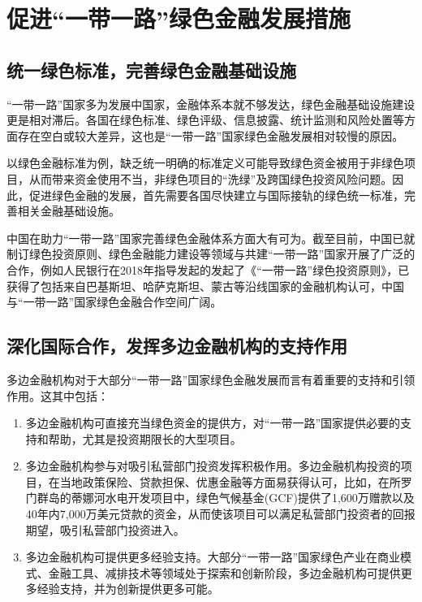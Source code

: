 \section*{促进“一带一路”绿色金融发展措施}
\subsection*{统一绿色标准，完善绿色金融基础设施}

“一带一路”国家多为发展中国家，金融体系本就不够发达，绿色金融基础设施建设更是相对滞后。各国在绿色标准、绿色评级、信息披露、统计监测和风险处置等方面存在空白或较大差异，这也是“一带一路”国家绿色金融发展相对较慢的原因。

以绿色金融标准为例，缺乏统一明确的标准定义可能导致绿色资金被用于非绿色项目，从而带来资金使用不当，非绿色项目的“洗绿”及跨国绿色投资风险问题。因此，促进绿色金融的发展，首先需要各国尽快建立与国际接轨的绿色统一标准，完善相关金融基础设施。

中国在助力“一带一路”国家完善绿色金融体系方面大有可为。截至目前，中国已就制订绿色投资原则、绿色金融能力建设等领域与共建“一带一路”国家开展了广泛的合作，例如人民银行在2018年指导发起的发起了《“一带一路”绿色投资原则》，已获得了包括来自巴基斯坦、哈萨克斯坦、蒙古等沿线国家的金融机构认可，中国与“一带一路”国家绿色金融合作空间广阔。

\subsection*{深化国际合作，发挥多边金融机构的支持作用}

多边金融机构对于大部分“一带一路”国家绿色金融发展而言有着重要的支持和引领作用。这其中包括：

\begin{enumerate}
    \item 多边金融机构可直接充当绿色资金的提供方，对“一带一路”国家提供必要的支持和帮助，尤其是投资期限长的大型项目。
    \item 多边金融机构参与对吸引私营部门投资发挥积极作用。多边金融机构投资的项目，在当地政策保险、贷款担保、优惠金融等方面易获得认可，比如，在所罗门群岛的蒂娜河水电开发项目中，绿色气候基金(GCF)提供了1,600万赠款以及40年内7,000万美元贷款的资金，从而使该项目可以满足私营部门投资者的回报期望，吸引私营部门投资进入。
    \item 多边金融机构可提供更多经验支持。大部分“一带一路”国家绿色产业在商业模式、金融工具、减排技术等领域处于探索和创新阶段，多边金融机构可提供更多经验支持，并为创新提供更多可能。
\end{enumerate}


